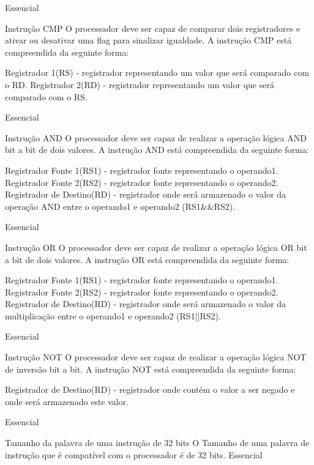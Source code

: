 \documentclass{article}
\begin{document}
\begin{functional}
      {Essencial}

     \requirement
      {Instrução CMP}
      {O processador deve ser capaz de comparar dois registradores e ativar ou desativar uma flag para sinalizar igualdade.
      A instrução CMP está compreendida da seguinte forma:}
      
       { Registrador 1(RS) - registrador representando um valor que será comparado com o RD.}
       { Registrador 2(RD) - registrador representando um valor que será comparado com o RS.}

      {Essencial}

      \requirement
      {Instrução AND}
      {O processador deve ser capaz de realizar a operação lógica AND bit a bit de dois valores.
      A instrução AND está compreendida da seguinte forma:}
       
        { Registrador Fonte 1(RS1) - registrador fonte representando o operando1.}
        { Registrador Fonte 2(RS2) - registrador fonte representando o operando2.}
        { Registrador de Destino(RD) - registrador onde será armazenado o valor da operação AND entre o operando1 e operando2 (RS1\&\&RS2).}
       
      {Essencial}

      \requirement
      {Instrução OR}
      {O processador deve ser capaz de realizar a operação lógica OR bit a bit de dois valores.
      A instrução OR está compreendida da seguinte forma:}
       
        { Registrador Fonte 1(RS1) - registrador fonte representando o operando1.}
        { Registrador Fonte 2(RS2) - registrador fonte representando o operando2.}
        { Registrador de Destino(RD) - registrador onde será armazenado o valor da multiplicação entre o operando1 e operando2 (RS1||RS2).}
       
      {Essencial}

      \requirement
      {Instrução NOT}
      {O processador deve ser capaz de realizar a operação lógica NOT de inversão bit a bit.
      A instrução NOT está compreendida da seguinte forma:}
       
         { Registrador de Destino(RD) - registrador onde contém o valor a ser negado e onde será armazenado este valor.}
         
      {Essencial}

      \requirement
      {Tamanho da palavra de uma instrução de 32 bits}
      {O Tamanho de uma palavra de instrução que é compatível com o processador é de 32 bits.}
      {Essencial}
      \end{functional}
\end{document}
